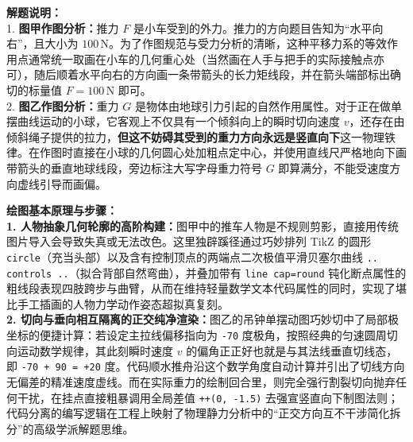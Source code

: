 \begin{center}
\end{center}

\vspace{0.6cm}

{\small\color{gray}
\textbf{解题说明：}\\
1. \textbf{图甲作图分析：}推力 $F$ 是小车受到的外力。推力的方向题目告知为“水平向右”，且大小为 $100\,\text{N}$。为了作图规范与受力分析的清晰，这种平移力系的等效作用点通常统一取画在小车的几何重心处（当然画在人手与把手的实际接触点亦可），随后顺着水平向右的方向画一条带箭头的长力矩线段，并在箭头端部标出确切的标量值 $F = 100\,\text{N}$ 即可。\\
2. \textbf{图乙作图分析：}重力 $G$ 是物体由地球引力引起的自然作用属性。对于正在做单摆曲线运动的小球，它客观上不仅具有一个倾斜向上的瞬时切向速度 $v$，还存在由倾斜绳子提供的拉力，\textbf{但这不妨碍其受到的重力方向永远是竖直向下}这一物理铁律。在作图时直接在小球的几何圆心处加粗点定中心，并使用直线尺严格地向下画带箭头的垂直地球线段，旁边标注大写字母重力符号 $G$ 即算满分，不能受速度方向虚线引导而画偏。
}

\vspace{0.6cm}

{\small\color{blue!70!black}
\textbf{绘图基本原理与步骤：}\\
\textbf{1. 人物抽象几何轮廓的高阶构建：}图甲中的推车人物是不规则剪影，直接用传统图片导入会导致失真或无法改色。这里独辟蹊径通过巧妙排列 TikZ 的圆形 \texttt{circle}（充当头部）以及含有控制顶点的两端点二次极值平滑贝塞尔曲线 \texttt{.. controls ..}（拟合背部自然弯曲），并叠加带有 \texttt{line cap=round} 钝化断点属性的粗线段表现四肢跨步与曲臂，从而在维持轻量数学文本代码属性的同时，实现了堪比手工插画的人物力学动作姿态超拟真复刻。\\
\textbf{2. 切向与垂向相互隔离的正交纯净渲染：}图乙的吊钟单摆动图巧妙切中了局部极坐标的便捷计算：若设定主拉线偏移指向为 \texttt{-70} 度极角，按照经典的匀速圆周切向运动数学规律，其此刻瞬时速度 $v$ 的偏角正正好也就是与其法线垂直切线态，即 \texttt{-70 + 90 = +20} 度。代码顺水推舟沿这个数学角度自动计算并引出了切线方向无偏差的精准速度虚线。而在实际重力的绘制回合里，则完全强行割裂切向抛弃任何干扰，在挂点直接粗暴调用全局差值 \texttt{++(0, -1.5)} 去强宣竖直向下制图法则；代码分离的编写逻辑在工程上映射了物理静力分析中的“正交方向互不干涉简化拆分”的高级学派解题思维。
}


